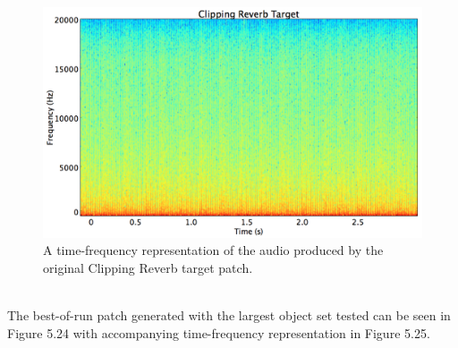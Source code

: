 \documentclass[a4paper,12pt]{report} 	%
\numberwithin{figure}{chapter}
\numberwithin{table}{chapter}
\numberwithin{equation}{chapter}
\begin{document}
\begin{flushleft}
\begin{figure}[h!]
\begin{center}
\includegraphics[scale=0.35,width=\linewidth]{ClippingReverbTargetSTFT}
\caption[Original Clipping Reverb Sawtooth Time-Frequency Representation]{A time-frequency representation of the audio produced by the original Clipping Reverb target patch.}
\end{center}
\end{figure}
\\

The best-of-run patch generated with the largest object set tested can be seen in Figure 5.24 with accompanying time-frequency representation in Figure 5.25.


\end{flushleft}
\end{document}
